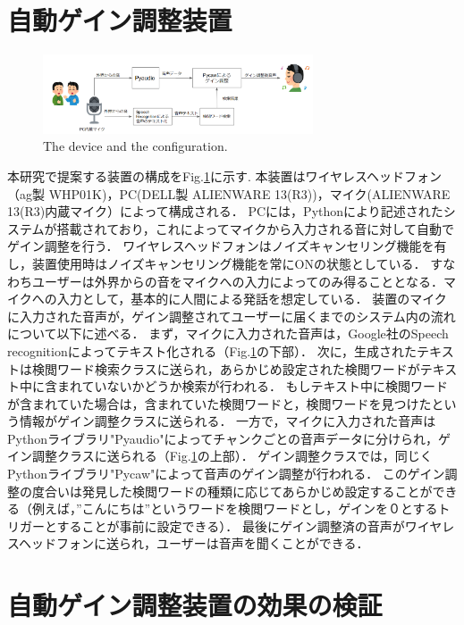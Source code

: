 \documentclass[a4paper]{jarticle}
\begin{document}
\section{自動ゲイン調整装置}
\begin{figure}[htbp]
    \begin{center}
    \includegraphics[width=80mm]{system.PNG}
    \caption{The device and the configuration.}
    \label{fig:system}
    \end{center}
    \end{figure}

本研究で提案する装置の構成をFig.\ref{fig:system}に示す.
本装置はワイヤレスヘッドフォン（ag製 WHP01K)，PC(DELL製 ALIENWARE 13(R3))，マイク(ALIENWARE 13(R3)内蔵マイク）によって構成される．
PCには，Pythonにより記述されたシステムが搭載されており，これによってマイクから入力される音に対して自動でゲイン調整を行う．
ワイヤレスヘッドフォンはノイズキャンセリング機能を有し，装置使用時はノイズキャンセリング機能を常にONの状態としている．
すなわちユーザーは外界からの音をマイクへの入力によってのみ得ることとなる．マイクへの入力として，基本的に人間による発話を想定している．
装置のマイクに入力された音声が，ゲイン調整されてユーザーに届くまでのシステム内の流れについて以下に述べる．
まず，マイクに入力された音声は，Google社のSpeech recognitionによってテキスト化される（Fig.\ref{fig:system}の下部）．
次に，生成されたテキストは検閲ワード検索クラスに送られ，あらかじめ設定された検閲ワードがテキスト中に含まれていないかどうか検索が行われる．
もしテキスト中に検閲ワードが含まれていた場合は，含まれていた検閲ワードと，検閲ワードを見つけたという情報がゲイン調整クラスに送られる．
一方で，マイクに入力された音声はPythonライブラリ"Pyaudio"によってチャンクごとの音声データに分けられ，ゲイン調整クラスに送られる（Fig.\ref{fig:system}の上部）．
ゲイン調整クラスでは，同じくPythonライブラリ"Pycaw"によって音声のゲイン調整が行われる．
このゲイン調整の度合いは発見した検閲ワードの種類に応じてあらかじめ設定することができる（例えば，”こんにちは”というワードを検閲ワードとし，ゲインを０とするトリガーとすることが事前に設定できる）．
最後にゲイン調整済の音声がワイヤレスヘッドフォンに送られ，ユーザーは音声を聞くことができる．
\section{自動ゲイン調整装置の効果の検証}
\end{document}
